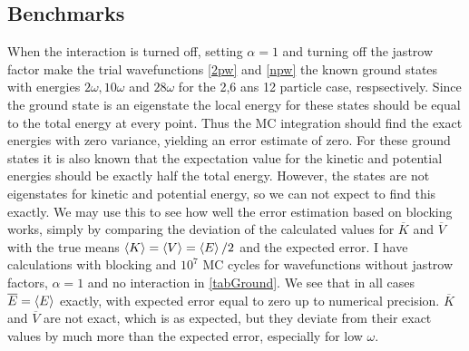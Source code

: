 \documentclass[a4paper,English,10pt]{article}
\renewcommand{\bar}{\overline}
\renewcommand{\braket}{\Braket}
\begin{document}
\subsection{Benchmarks}
When the interaction is turned off, setting $\alpha = 1$ and turning off the jastrow factor make the trial wavefunctions \ref{2pw} and \ref{npw} the known ground states
with energies $2\omega, 10\omega$ and $28\omega$ for the 2,6 ans 12 particle case, respsectively. Since the ground state is an eigenstate the local energy for these states
should be equal to the total energy at every point. Thus the MC integration should find the exact energies with zero variance, yielding an error estimate of zero.
For these ground states it is also known that the expectation value for the kinetic and potential energies should be exactly half the total energy. However,
the states are not eigenstates for kinetic and potential energy, so we can not expect to find this exactly. We may use this to see how well the error estimation based
on blocking works, simply by comparing the deviation of the calculated values for $\bar{K}$ and $\bar{V}$ with the true means $\braket{K} = \braket{V} = \braket{E}/2$ and
the expected error. I have calculations with blocking and $10^7$ MC cycles for wavefunctions without jastrow factors, $\alpha = 1$ and no interaction in \ref{tabGround}. 
We see that in all cases $\bar{E} = \braket{E}$ exactly, with expected error equal to zero up to numerical precision. $\bar{K}$ and $\bar{V}$ are not exact, which is as expected,
but they deviate from their exact values by much more than the expected error, especially for low $\omega$.
\end{document}
